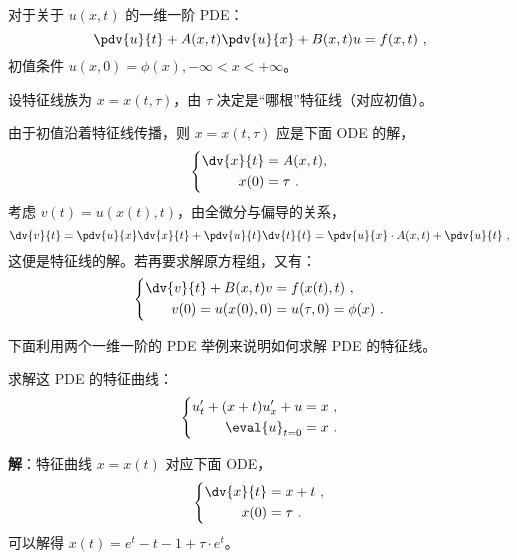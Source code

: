 \begin{theorem}{}
对于关于 $u(x, t)$ 的一维一阶 PDE：
\begin{equation}
\pdv{u}{t} + A(x, t) \pdv{u}{x} + B(x, t) u = f(x, t) ~,
\end{equation}
初值条件 $u(x, 0) = \phi(x), -\infty < x < +\infty$。

设特征线族为 $x = x(t, \tau)$，由 $\tau$ 决定是“哪根”特征线（对应初值）。

由于初值沿着特征线传播，则 $x = x(t, \tau)$ 应是下面 ODE 的解，
\begin{equation}
\left\{
\begin{aligned}
\dv{x}{t} &= A(x, t), \\
x(0) &= \tau ~.
\end{aligned}
\right .
\end{equation}
考虑 $v(t) = u(x(t), t)$，由全微分与偏导的关系，
$$\dv{v}{t} = \pdv{u}{x} \dv{x}{t} + \pdv{u}{t} \dv{t}{t} = \pdv{u}{x} \cdot A(x, t) + \pdv{u}{t} ~,$$
这便是特征线的解。若再要求解原方程组，又有：
\begin{equation}
\left\{
\begin{aligned}
\dv{v}{t} + B(x, t) v &= f(x(t), t) ~, \\
v(0) = u(x(0), 0) &= u(\tau, 0) = \phi(x) ~.
\end{aligned}
\right.
\end{equation}
\end{theorem}











下面利用两个一维一阶的 PDE 举例来说明如何求解 PDE 的特征线。
\begin{example}{}
求解这 PDE 的特征曲线：
\begin{equation}
\left \{ 
\begin{aligned}
u'_t + (x + t) u'_x + u &= x ~, \\
\eval{u}_{t=0} &= x ~.
\end{aligned}
\right .
\end{equation}

\textbf{解}：特征曲线 $x=x(t)$ 对应下面 ODE，
\begin{equation}
\left \{ 
\begin{aligned}
\dv{x}{t} &= x+t ~, \\
x(0) &= \tau ~.
\end{aligned}
\right .
\end{equation}
可以解得 $x(t) = e^t - t - 1 + \tau \cdot e^t$。
\end{example}









